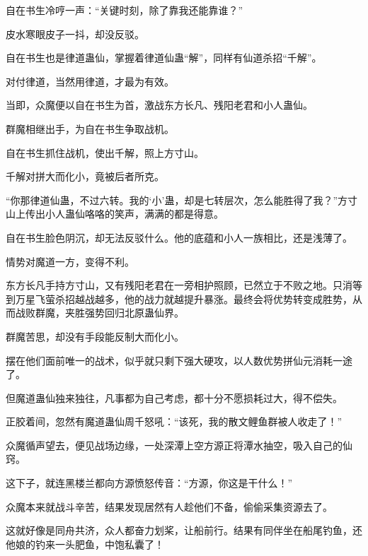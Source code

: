 \begin{this_body}
自在书生冷哼一声：“关键时刻，除了靠我还能靠谁？”

皮水寒眼皮子一抖，却没反驳。

自在书生也是律道蛊仙，掌握着律道仙蛊“解”，同样有仙道杀招“千解”。

对付律道，当然用律道，才最为有效。

当即，众魔便以自在书生为首，激战东方长凡、残阳老君和小人蛊仙。

群魔相继出手，为自在书生争取战机。

自在书生抓住战机，使出千解，照上方寸山。

千解对拼大而化小，竟被后者所克。

“你那律道仙蛊，不过六转。我的‘小’蛊，却是七转层次，怎么能胜得了我？”方寸山上传出小人蛊仙咯咯的笑声，满满的都是得意。

自在书生脸色阴沉，却无法反驳什么。他的底蕴和小人一族相比，还是浅薄了。

情势对魔道一方，变得不利。

东方长凡手持方寸山，又有残阳老君在一旁相护照顾，已然立于不败之地。只消等到万星飞萤杀招越战越多，他的战力就越提升暴涨。最终会将优势转变成胜势，从而战败群魔，夹胜强势回归北原蛊仙界。

群魔苦思，却没有手段能反制大而化小。

摆在他们面前唯一的战术，似乎就只剩下强大硬攻，以人数优势拼仙元消耗一途了。

但魔道蛊仙独来独往，凡事都为自己考虑，都十分不愿损耗过大，得不偿失。

正胶着间，忽然有魔道蛊仙周千怒吼：“该死，我的散文鲤鱼群被人收走了！”

众魔循声望去，便见战场边缘，一处深潭上空方源正将潭水抽空，吸入自己的仙窍。

这下子，就连黑楼兰都向方源愤怒传音：“方源，你这是干什么！”

众魔本来就战斗辛苦，结果发现居然有人趁他们不备，偷偷采集资源去了。

这就好像是同舟共济，众人都奋力划桨，让船前行。结果有同伴坐在船尾钓鱼，还他娘的钓来一头肥鱼，中饱私囊了！

\end{this_body}

